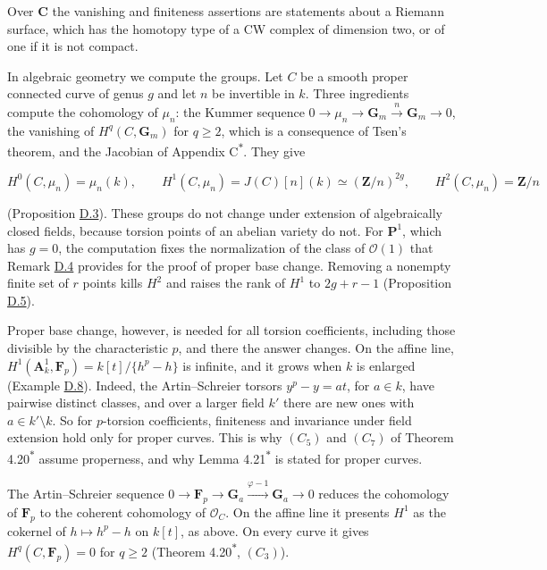 \documentclass[11pt]{article}
\newcommand{\bpout}[1]{#1\textsuperscript{\hyperlink{bp-outside}{\ensuremath{\ast}}}}
\begin{document}
Over \(\mathbf C\) the vanishing and finiteness assertions are statements about a Riemann surface, which has the homotopy type of a CW complex of dimension two, or of one if it is not compact.

In algebraic geometry we compute the groups. Let \(C\) be a smooth proper connected curve of genus \(g\) and let \(n\) be invertible in \(k\). Three ingredients compute the cohomology of \(\mu_n\): the Kummer sequence \(0\to\mu_n\to\mathbf G_m\xrightarrow{n}\mathbf G_m\to0\), the vanishing of \(H^q(C,\mathbf G_m)\) for \(q\geq2\), which is a consequence of Tsen's theorem, and the Jacobian of Appendix \bpout{C}. They give

\[
H^0(C,\mu_n)=\mu_n(k),\qquad H^1(C,\mu_n)=J(C)[n](k)\simeq(\mathbf Z/n)^{2g},
\qquad H^2(C,\mu_n)=\mathbf Z/n
\]

(Proposition \hyperref[bp10]{D.3}). These groups do not change under extension of algebraically closed fields, because torsion points of an abelian variety do not. For \(\mathbf P^1\), which has \(g=0\), the computation fixes the normalization of the class of \(\mathcal O(1)\) that Remark \hyperref[bp12]{D.4} provides for the proof of proper base change. Removing a nonempty finite set of \(r\) points kills \(H^2\) and raises the rank of \(H^1\) to \(2g+r-1\) (Proposition \hyperref[bp15]{D.5}).

Proper base change, however, is needed for all torsion coefficients, including those divisible by the characteristic \(p\), and there the answer changes. On the affine line, \(H^1(\mathbf A^1_k,\mathbf F_p)=k[t]/\{h^p-h\}\) is infinite, and it grows when \(k\) is enlarged (Example \hyperref[bp26]{D.8}). Indeed, the Artin–Schreier torsors \(y^p-y=at\), for \(a\in k\), have pairwise distinct classes, and over a larger field \(k'\) there are new ones with \(a\in k'\setminus k\). So for \(p\)-torsion coefficients, finiteness and invariance under field extension hold only for proper curves. This is why \((C_5)\) and \((C_7)\) of Theorem \bpout{4.20} assume properness, and why Lemma \bpout{4.21} is stated for proper curves.

The Artin–Schreier sequence \(0\to\mathbf F_p\to\mathbf G_a\xrightarrow{\varphi-1}\mathbf G_a\to0\) reduces the cohomology of \(\mathbf F_p\) to the coherent cohomology of \(\mathcal O_C\). On the affine line it presents \(H^1\) as the cokernel of \(h\mapsto h^p-h\) on \(k[t]\), as above. On every curve it gives \(H^q(C,\mathbf F_p)=0\) for \(q\geq2\) (Theorem \bpout{4.20}, \((C_3)\)).
\end{document}

